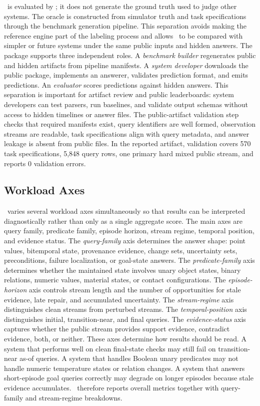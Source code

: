 \engine\ is evaluated by \bench; it does not generate the ground truth used to judge other systems. The oracle is constructed from simulator truth and task specifications through the benchmark generation pipeline. This separation avoids making the reference engine part of the labeling process and allows \engine\ to be compared with simpler or future systems under the same public inputs and hidden answers.
The package supports three independent roles. A \emph{benchmark builder} regenerates public and hidden artifacts from pipeline manifests. A \emph{system developer} downloads the public package, implements an answerer, validates prediction format, and emits predictions. An \emph{evaluator} scores predictions against hidden answers. This separation is important for artifact review and public leaderboards: system developers can test parsers, run baselines, and validate output schemas without access to hidden timelines or answer files.
The public-artifact validation step checks that required manifests exist, query identifiers are well formed, observation streams are readable, task specifications align with query metadata, and answer leakage is absent from public files. In the reported artifact, validation covers 570 task specifications, 5,848 query rows, one primary hard mixed public stream, and reports 0 validation errors.

\subsection{Workload Axes}

\bench\ varies several workload axes simultaneously so that results can be interpreted diagnostically rather than only as a single aggregate score. The main axes are query family, predicate family, episode horizon, stream regime, temporal position, and evidence status.
The \emph{query-family} axis determines the answer shape: point values, bitemporal state, provenance evidence, change sets, uncertainty sets, preconditions, failure localization, or goal-state answers. The \emph{predicate-family} axis determines whether the maintained state involves unary object states, binary relations, numeric values, material states, or contact configurations. The \emph{episode-horizon} axis controls stream length and the number of opportunities for stale evidence, late repair, and accumulated uncertainty. The \emph{stream-regime} axis distinguishes clean streams from perturbed streams. The \emph{temporal-position} axis distinguishes initial, transition-near, and final queries. The \emph{evidence-status} axis captures whether the public stream provides support evidence, contradict evidence, both, or neither.
These axes determine how results should be read. A system that performs well on clean final-state checks may still fail on transition-near as-of queries. A system that handles Boolean unary predicates may not handle numeric temperature states or relation changes. A system that answers short-episode goal queries correctly may degrade on longer episodes because stale evidence accumulates. \bench\ therefore reports overall metrics together with query-family and stream-regime breakdowns.

